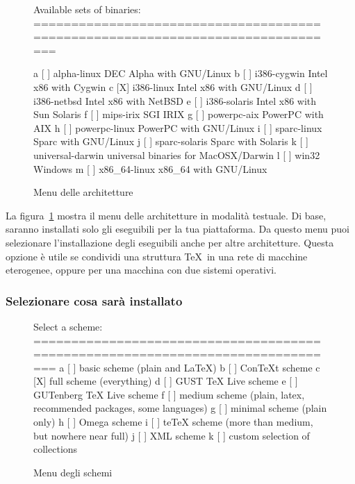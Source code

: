 \documentclass{article}
\begin{document}
\begin{figure}[tbh]
\begin{boxedverbatim}
Available sets of binaries:
===============================================================================

   a [ ] alpha-linux      DEC Alpha with GNU/Linux
   b [ ] i386-cygwin      Intel x86 with Cygwin
   c [X] i386-linux       Intel x86 with GNU/Linux
   d [ ] i386-netbsd      Intel x86 with NetBSD
   e [ ] i386-solaris     Intel x86 with Sun Solaris
   f [ ] mips-irix        SGI IRIX
   g [ ] powerpc-aix      PowerPC with AIX
   h [ ] powerpc-linux    PowerPC with GNU/Linux
   i [ ] sparc-linux      Sparc with GNU/Linux
   j [ ] sparc-solaris    Sparc with Solaris
   k [ ] universal-darwin universal binaries for MacOSX/Darwin
   l [ ] win32            Windows
   m [ ] x86_64-linux     x86_64 with GNU/Linux
\end{boxedverbatim}
\caption{Menu delle architetture}\label{fig:bin-text}
\end{figure}

La figura~\ref{fig:bin-text} mostra il menu delle architetture in modalità
testuale. Di base, saranno installati solo gli eseguibili per la tua
piattaforma. Da questo menu puoi selezionare l'installazione degli
eseguibili anche per altre architetture. Questa opzione è utile se
condividi una struttura \TeX\ in una rete di macchine eterogenee, oppure
per una macchina con due sistemi operativi.

\subsubsection{Selezionare cosa sarà installato}
\label{sec:components}

\begin{figure}[tbh]
\begin{boxedverbatim}
Select a scheme:
===============================================================================
 a [ ] basic scheme (plain and LaTeX)
 b [ ] ConTeXt scheme
 c [X] full scheme (everything)
 d [ ] GUST TeX Live scheme
 e [ ] GUTenberg TeX Live scheme
 f [ ] medium scheme (plain, latex, recommended packages, some languages)
 g [ ] minimal scheme (plain only)
 h [ ] Omega scheme
 i [ ] teTeX scheme (more than medium, but nowhere near full)
 j [ ] XML scheme
 k [ ] custom selection of collections
\end{boxedverbatim}
\caption{Menu degli schemi}\label{fig:scheme-text}
\end{figure}
\end{document}
